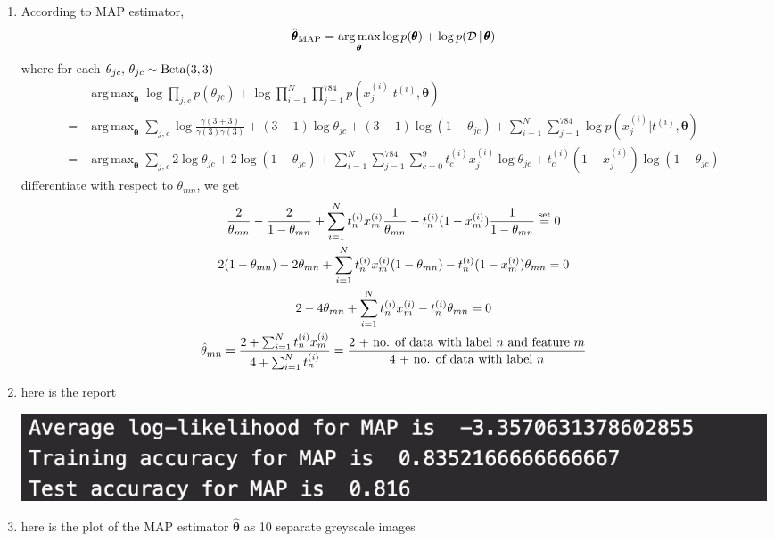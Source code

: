 \documentclass[12pt]{article}
\DeclareMathOperator*{\argmax}{arg\,max}
\begin{document}
\begin{enumerate}
\begin{enumerate}
    \item According to MAP estimator, 
    \[\hat{\pmb \theta}_{\tx{MAP}} = \argmax_{\pmb \theta} \log p(\pmb \theta)
    + \log p(\mathcal D \vert \pmb \theta) \]
    where for each $\theta_{jc}, \, \theta_{jc} \sim \text{{Beta}}(3, 3)$ \\
    \begin{align*}
      & \argmax_{\pmb \theta} \log \prod_{j, c} p(\theta_{jc})
      + \log \prod_{i=1}^{N} \prod_{j=1}^{784} p(x_j^{(i)} \vert t^{(i)}, \pmb \theta) \\
      =& \argmax_{\pmb \theta} \sum_{j, c} \log \frac{\gamma(3+3)}{\gamma(3)\gamma(3)}
      + (3-1) \log \theta_{jc} + (3-1) \log (1 - \theta_{jc}) 
      + \sum_{i=1}^N \sum_{j=1}^{784} \log p(x_j^{(i)} \vert t^{(i)}, \pmb \theta) \\
      =& \argmax_{\pmb \theta} \sum_{j, c} 2 \log \theta_{jc} + 2 \log (1 - \theta_{jc}) +
      \sum_{i=1}^N\sum_{j=1}^{784} \sum_{c=0}^9 t_c^{(i)} x_j^{(i)}\log \theta_{jc}
      + t_c^{(i)}(1 - x_j^{(i)}) \log (1 - \theta_{jc}) 
    \end{align*}
    differentiate with respect to $\theta_{mn}$, we get 
    \begin{gather*}
      \frac{2}{\theta_{mn}} - \frac{2}{1-\theta_{mn}} + 
      \sum_{i=1}^N t_n^{(i)} x_m^{(i)} \frac{1}{\theta_{mn}} - t_n^{(i)}
      (1-x_m^{(i)})\frac{1}{1-\theta_{mn}} \overset{\text{{set}}}{=} 0 \\
      2(1-\theta_{mn}) - 2\theta_{mn} + \sum_{i=1}^N t_n^{(i)} x_m^{(i)} (1-\theta_{mn})
      - t_n^{(i)} (1-x_m^{(i)}) \theta_{mn} = 0 \\
      2 - 4\theta_{mn} + \sum_{i=1}^N t^{(i)}_n x_m^{(i)} - t_n^{(i)} \theta_{mn} = 0 \\
      \hat{\theta}_{mn} = \frac{2 + \sum_{i=1}^N t_n^{(i)} x_m^{(i)}}{4 + \sum_{i=1}^N t_n^{(i)}} 
      = \frac{\text{{2 + no. of data with label $n$ and feature $m$}}}
      {\text{{4 + no. of data with label $n$}}}
    \end{gather*}
    \newpage
    \item here is the report 
    \begin{center}\includegraphics[scale=0.5]{q2.jpg} \end{center} 
    \item here is the plot of the MAP estimator $\hat{\pmb \theta}$ as 10 separate greyscale images \\

\end{enumerate}
\end{enumerate}
\end{document}
